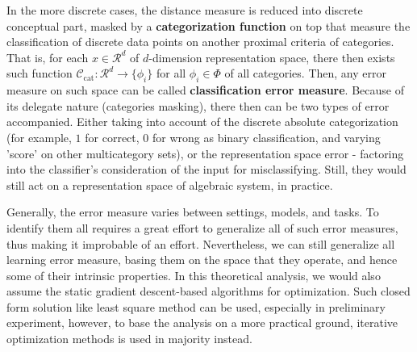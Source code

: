 \documentclass[twoside,10pt]{article}
\begin{document}
In the more discrete cases, the distance measure is reduced into discrete conceptual part, masked by a \textbf{categorization function} on top that measure the classification of discrete data points on another proximal criteria of categories. That is, for each $x\in \mathcal{R}^{d}$ of $d$-dimension representation space, there then exists such function $\mathcal{C}_{\mathrm{cat}}: \mathcal{R}^{d}\to \{\phi_{i}\}$ for all $\phi_{i}\in \Phi$ of all categories. Then, any error measure on such space can be called \textbf{classification error measure}. Because of its delegate nature (categories masking), there then can be two types of error accompanied. Either taking into account of the discrete absolute categorization (for example, $1$ for correct, $0$ for wrong as binary classification, and varying 'score' on other multicategory sets), or the representation space error - factoring into the classifier's consideration of the input for misclassifying. Still, they would still act on a representation space of algebraic system, in practice. 

Generally, the error measure varies between settings, models, and tasks. To identify them all requires a great effort to generalize all of such error measures, thus making it improbable of an effort. Nevertheless, we can still generalize all learning error measure, basing them on the space that they operate, and hence some of their intrinsic properties. In this theoretical analysis, we would also assume the static gradient descent-based algorithms for optimization. Such closed form solution like least square method can be used, especially in preliminary experiment, however, to base the analysis on a more practical ground, iterative optimization methods is used in majority instead. 
\end{document}
